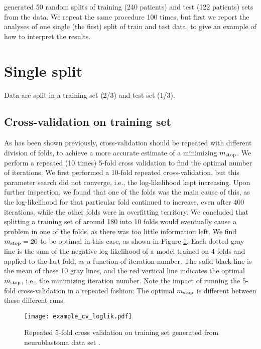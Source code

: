 \citet{bovelstad2009} generated 50 random splits of training (240 patients) and test (122 patients) sets from the data.
We repeat the same procedure 100 times, but first we report the analyses of one single (the first) split of train and test data, to give an example of how to interpret the results.

\section{Single split}
Data are split in a training set (2/3) and test set (1/3).

\subsection{Cross-validation on training set}
As has been shown previously, cross-validation should be repeated with different division of folds, to achieve a more accurate estimate of a minimizing $m_{\text{stop}}$.
We perform a repeated (10 times) 5-fold cross validation to find the optimal number of iterations.
We first performed a 10-fold repeated cross-validation, but this parameter search did not converge, i.e., the log-likelihood kept increasing.
Upon further inspection, we found that one of the folds was the main cause of this, as the log-likelihood for that particular fold continued to increase, even after 400 iterations, while the other folds were in overfitting territory.
We concluded that splitting a training set of around 180 into 10 folds would eventually cause a problem in one of the folds, as there was too little information left.
We find $m_{\text{stop}}=20$ to be optimal in this case, as shown in Figure \ref{fig:neuroblastoma-cv}.
Each dotted gray line is the sum of the negative log-likelihood of a model trained on 4 folds and applied to the last fold, as a function of iteration number.
The solid black line is the mean of these 10 gray lines, and the red vertical line indicates the optimal $m_{\text{stop}}$, i.e., the minimizing iteration number.
Note the impact of running the 5-fold cross-validation in a repeated fashion:
The optimal $m_{\text{stop}}$ is different between these different runs.

\begin{figure}
\caption{Repeated 5-fold cross validation on training set generated from neuroblastoma data set \citep{oberthuer-data}.}
\label{fig:neuroblastoma-cv}
\centering\texttt{[image: example\_cv\_loglik.pdf]}
\end{figure}

